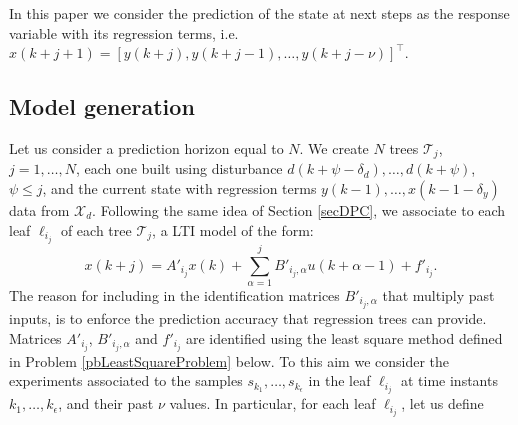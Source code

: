 \documentclass[]{ifacconf}  %
\begin{document}
In this paper we consider the prediction of the state at next steps as the response variable with its regression terms, i.e. $x(k+j+1) = [y(k+j), y(k+j-1), \ldots, y(k+j-\nu)]^\top$.

\subsection{Model generation}\label{ssecEstimation}
Let us consider a prediction horizon equal to $N$. 
We create $N$ trees $\mathcal{T}_j$, $j = 1,\ldots,N$, each one built using disturbance $d(k+\psi-\delta_d),\ldots,d(k + \psi)$, $\psi\leq j$, and the current state with regression terms $y(k-1),\ldots,x(k-1-\delta_y)$ data from $\mathcal{X}_d$.
Following the same idea of Section \ref{secDPC}, we associate to each leaf $\ell_{i_j}$ of each tree $\mathcal{T}_j$, a LTI model of the form:
\small
\begin{equation}\label{eqLTIleaves}
	x(k+j) = A'_{i_j}x(k) + \sum_{\alpha = 1}^{j}{B'_{i_j,\alpha}u(k+\alpha-1)} + f'_{i_j}.
\end{equation}
\normalsize
The reason for including in the identification matrices $B'_{i_j,\alpha}$ that multiply past inputs, is to enforce the prediction accuracy that regression trees can provide.
Matrices $A'_{i_j}$, $B'_{i_j,\alpha}$ and $f'_{i_j}$ are identified using the least square method defined in Problem \ref{pbLeastSquareProblem} below. 
To this aim we consider the experiments associated to the samples $s_{k_1},\ldots,s_{k_\epsilon}$ in the leaf $\ell_{i_j}$ at time instants $k_1,\ldots,k_\epsilon$, and their past $\nu$ values. 
In particular, for each leaf $\ell_{i_j}$, let us define
\small
\end{document}
